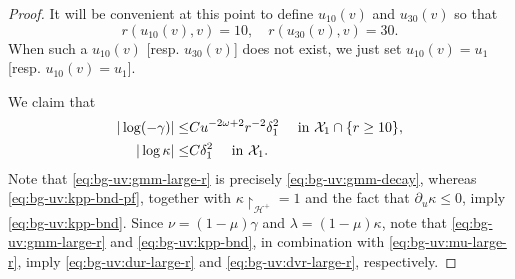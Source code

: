 \documentclass[10pt, reqno]{amsart}
\theoremstyle{definition}
\theoremstyle{remark}
\theoremstyle{conjecture}
\numberwithin{equation}{section}
\newcommand{\abs}[1]{\vert#1\vert}
\newcommand{\set}[1]{\{#1\}}
\newcommand{\rd}{\partial}
\newcommand{\0}{\emptyset}
\newcommand{\gmm}{\gamma}
\newcommand{\dlt}{\delta}
\newcommand{\kpp}{\kappa}
\newcommand{\lmb}{\lambda}
\newcommand{\omg}{\omega}
\newcommand{\calH}{\mathcal H}
\newcommand{\calX}{\mathcal X}
\newcommand{\dur}{\nu}
\newcommand{\dvr}{\lmb}
\newcommand{\EH}{\calH^{+}}
\begin{document}
\begin{proof}
It will be convenient at this point to define $u_{10}(v)$ and $u_{30}(v)$ so that 
$$r(u_{10}(v),v)=10,\quad r(u_{30}(v),v)=30.$$
When such a $u_{10}(v)$ [resp. $u_{30}(v)$] does not exist, we just set $u_{10}(v) = u_{1}$ [resp. $u_{10}(v) = u_{1}$].

We claim that
\begin{align} 
	\abs{\log (-\gmm)} \leq & C u^{-2 \omg + 2} r^{-2} \dlt_{1}^{2} \quad \hbox{ in } \calX_{1} \cap \set{r \geq 10}, 	\label{eq:bg-uv:gmm-large-r} \\
	\abs{\log \kpp} \leq & C \dlt_{1}^{2} \quad \hbox{ in } \calX_{1}. \label{eq:bg-uv:kpp-bnd-pf}
\end{align}
Note that \eqref{eq:bg-uv:gmm-large-r} is precisely \eqref{eq:bg-uv:gmm-decay}, whereas \eqref{eq:bg-uv:kpp-bnd-pf}, together with $\kappa\restriction_{\EH}=1$ and the fact that $\rd_u\kappa\leq 0$, imply \eqref{eq:bg-uv:kpp-bnd}. Since $\dur = (1-\mu) \gmm$ and $\dvr = (1-\mu) \kpp$, note that \eqref{eq:bg-uv:gmm-large-r} and \eqref{eq:bg-uv:kpp-bnd}, in combination with \eqref{eq:bg-uv:mu-large-r}, imply \eqref{eq:bg-uv:dur-large-r} and \eqref{eq:bg-uv:dvr-large-r}, respectively.


\end{proof}
\end{document}

